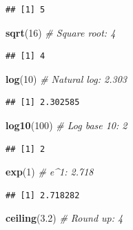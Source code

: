 \documentclass[
]{article}
\newenvironment{Shaded}{\begin{snugshade}}{\end{snugshade}}
\newcommand{\CommentTok}[1]{\textcolor[rgb]{0.56,0.35,0.01}{\textit{#1}}}
\newcommand{\DecValTok}[1]{\textcolor[rgb]{0.00,0.00,0.81}{#1}}
\newcommand{\FloatTok}[1]{\textcolor[rgb]{0.00,0.00,0.81}{#1}}
\newcommand{\FunctionTok}[1]{\textcolor[rgb]{0.13,0.29,0.53}{\textbf{#1}}}
\newcommand{\NormalTok}[1]{#1}
\begin{document}
\begin{verbatim}
## [1] 5
\end{verbatim}

\begin{Shaded}
\begin{Highlighting}[]
\FunctionTok{sqrt}\NormalTok{(}\DecValTok{16}\NormalTok{)           }\CommentTok{\# Square root: 4}
\end{Highlighting}
\end{Shaded}

\begin{verbatim}
## [1] 4
\end{verbatim}

\begin{Shaded}
\begin{Highlighting}[]
\FunctionTok{log}\NormalTok{(}\DecValTok{10}\NormalTok{)            }\CommentTok{\# Natural log: 2.303}
\end{Highlighting}
\end{Shaded}

\begin{verbatim}
## [1] 2.302585
\end{verbatim}

\begin{Shaded}
\begin{Highlighting}[]
\FunctionTok{log10}\NormalTok{(}\DecValTok{100}\NormalTok{)         }\CommentTok{\# Log base 10: 2}
\end{Highlighting}
\end{Shaded}

\begin{verbatim}
## [1] 2
\end{verbatim}

\begin{Shaded}
\begin{Highlighting}[]
\FunctionTok{exp}\NormalTok{(}\DecValTok{1}\NormalTok{)             }\CommentTok{\# e\^{}1: 2.718}
\end{Highlighting}
\end{Shaded}

\begin{verbatim}
## [1] 2.718282
\end{verbatim}

\begin{Shaded}
\begin{Highlighting}[]
\FunctionTok{ceiling}\NormalTok{(}\FloatTok{3.2}\NormalTok{)       }\CommentTok{\# Round up: 4}
\end{Highlighting}
\end{Shaded}
\end{document}

